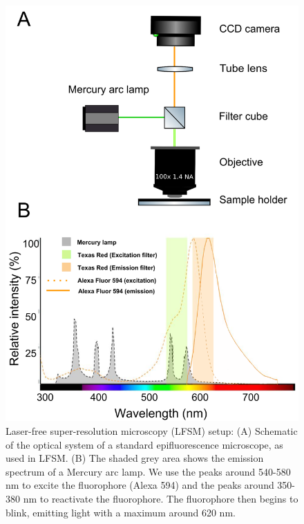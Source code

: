 \documentclass[9pt,twocolumn,twoside]{pnas-new}
\begin{document}
\begin{figure}[h!]
\includegraphics[width=\linewidth]{Figures/Fig1.png}
\caption[]{Laser-free super-resolution microscopy (LFSM) setup: (A) Schematic of the optical system of a standard epifluorescence microscope, as used in LFSM. (B) The shaded grey area shows the emission spectrum of a Mercury arc lamp. We use the peaks around 540-580 nm to excite the fluorophore (Alexa 594) and the peaks around 350-380 nm to reactivate the fluorophore. The fluorophore then begins to blink, emitting light with a maximum around 620 nm.} \label{fig:setup}
\end{figure}
\end{document}
